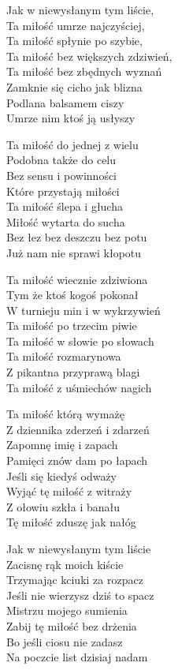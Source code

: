 \begin{text}
    Jak w niewysłanym tym liście,\\
    Ta miłość umrze najczyściej,\\
    Ta miłość spłynie po szybie,\\
    Ta miłość bez większych zdziwień,\\
    Ta miłość bez zbędnych wyznań\\
    Zamknie się cicho jak blizna\\
    Podlana balsamem ciszy\\
    Umrze nim ktoś ją usłyszy

    Ta miłość do jednej z wielu\\
    Podobna także do celu\\
    Bez sensu i powinności\\
    Które przystają miłości\\
    Ta miłość ślepa i głucha\\
    Miłość wytarta do sucha\\
    Bez łez bez deszczu bez potu\\
    Już nam nie sprawi kłopotu

    Ta miłość wiecznie zdziwiona\\
    Tym że ktoś kogoś pokonał\\
    W turnieju min i w wykrzywień\\
    Ta miłość po trzecim piwie\\
    Ta miłość w słowie po słowach\\
    Ta miłość rozmarynowa\\
    Z pikantna przyprawą blagi\\
    Ta miłość z uśmiechów nagich

    Ta miłość którą wymażę\\
    Z dziennika zderzeń i zdarzeń\\
    Zapomnę imię i zapach\\
    Pamięci znów dam po łapach\\
    Jeśli się kiedyś odważy\\
    Wyjąć tę miłość z witraży\\
    Z ołowiu szkła i banału\\
    Tę miłość zduszę jak nałóg

    Jak w niewysłanym tym liście\\
    Zacisnę rąk moich kiście\\
    Trzymając kciuki za rozpacz\\
    Jeśli nie wierzysz dziś to spacz\\
    Mistrzu mojego sumienia\\
    Zabij tę miłość bez drżenia\\
    Bo jeśli ciosu nie zadasz\\
    Na poczcie list dzisiaj nadam
\end{text}
\begin{chord}

\end{chord}